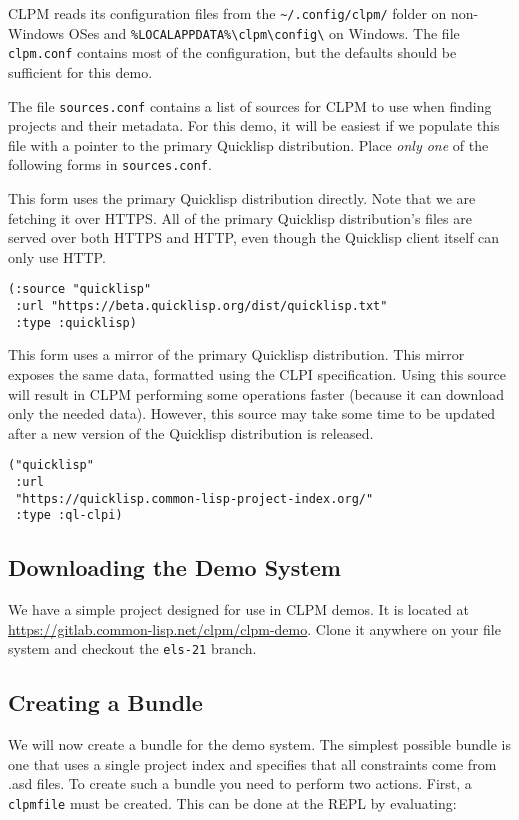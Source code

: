 \documentclass[format=sigconf]{acmart}
\begin{document}
CLPM reads its configuration files from the \verb|~/.config/clpm/| folder on
non-Windows OSes and \verb|%LOCALAPPDATA%\clpm\config\| on
Windows. The file {\tt clpm.conf} contains most of the configuration, but the
defaults should be sufficient for this demo.

The file {\tt sources.conf} contains a list of sources for CLPM to use when
finding projects and their metadata. For this demo, it will be easiest if we
populate this file with a pointer to the primary Quicklisp distribution. Place
{\it only one} of the following forms in {\tt sources.conf}.

This form uses the primary Quicklisp distribution directly. Note that we are
fetching it over HTTPS. All of the primary Quicklisp distribution's files are
served over both HTTPS and HTTP, even though the Quicklisp client itself can
only use HTTP.

\begin{verbatim}
(:source "quicklisp"
 :url "https://beta.quicklisp.org/dist/quicklisp.txt"
 :type :quicklisp)
\end{verbatim}

This form uses a mirror of the primary Quicklisp distribution. This mirror
exposes the same data, formatted using the CLPI specification. Using this
source will result in CLPM performing some operations faster (because it can
download only the needed data). However, this source may take some time to be
updated after a new version of the Quicklisp distribution is released.

\begin{verbatim}
("quicklisp"
 :url
 "https://quicklisp.common-lisp-project-index.org/"
 :type :ql-clpi)
\end{verbatim}

\subsection{Downloading the Demo System}

We have a simple project designed for use in CLPM demos. It is located at
\url{https://gitlab.common-lisp.net/clpm/clpm-demo}. Clone it anywhere on your
file system and checkout the {\tt els-21} branch.

\subsection{Creating a Bundle}

We will now create a bundle for the demo system. The simplest possible bundle
is one that uses a single project index and specifies that all constraints come
from .asd files. To create such a bundle you need to perform two
actions. First, a {\tt clpmfile} must be created. This can be done at the REPL
by evaluating:
\end{document}
